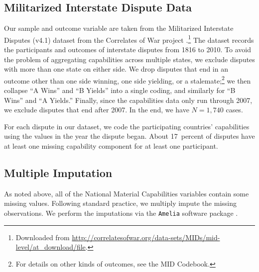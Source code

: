 \subsection{Militarized Interstate Dispute Data}

Our sample and outcome variable are taken from the Militarized Interstate Disputes (v4.1) dataset from the Correlates of War project .\footnote{%
  Downloaded from \url{http://correlatesofwar.org/data-sets/MIDs/mid-level/at_download/file}.
}
The dataset records the participants and outcomes of interstate disputes from 1816 to 2010.
To avoid the problem of aggregating capabilities across multiple states, we exclude disputes with more than one state on either side.
We drop disputes that end in an outcome other than one side winning, one side yielding, or a stalemate;\footnote{%
  For details on other kinds of outcomes, see the MID Codebook.
}
we then collapse ``A Wins'' and ``B Yields'' into a single coding, and similarly for ``B Wins'' and ``A Yields.''
Finally, since the capabilities data only run through 2007, we exclude disputes that end after 2007.
In the end, we have $N = 1{,}740$ cases.

For each dispute in our dataset, we code the participating countries' capabilities using the values in the year the dispute began.
About 17~percent of disputes have at least one missing capability component for at least one participant.

\subsection{Multiple Imputation}

As noted above, all of the National Material Capabilities variables contain some missing values.
Following standard practice, we multiply impute the missing observations.
We perform the imputations via the \texttt{Amelia} software package .

